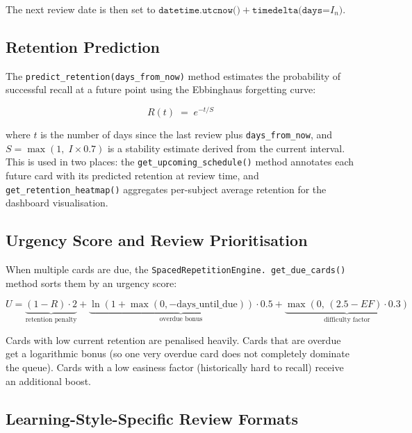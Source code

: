 \documentclass[12pt,a4paper]{article}
\begin{document}
The next review date is then set to
$\texttt{datetime.utcnow()} + \texttt{timedelta(days=}I_n\texttt{)}$.

\subsection{Retention Prediction}

The \texttt{predict\_retention(days\_from\_now)} method estimates
the probability of successful recall at a future point using the
Ebbinghaus forgetting curve:

\begin{equation}
  R(t) \;=\; e^{-t/S}
\end{equation}

where $t$ is the number of days since the last review plus
\texttt{days\_from\_now}, and $S = \max(1,\; I \times 0.7)$ is a
stability estimate derived from the current interval. This is used
in two places: the \texttt{get\_upcoming\_schedule()} method
annotates each future card with its predicted retention at review
time, and \texttt{get\_retention\_heatmap()} aggregates per-subject
average retention for the dashboard visualisation.

\subsection{Urgency Score and Review Prioritisation}

When multiple cards are due, the \texttt{SpacedRepetitionEngine.
get\_due\_cards()} method sorts them by an urgency score:

\begin{equation}
  U = \underbrace{(1-R)\cdot 2}_{\text{retention penalty}}
  + \underbrace{\ln(1 + \max(0, -\text{days\_until\_due}))\cdot 0.5}
              _{\text{overdue bonus}}
  + \underbrace{\max(0,\,(2.5-EF)\cdot 0.3)}_{\text{difficulty factor}}
\end{equation}

Cards with low current retention are penalised heavily. Cards that
are overdue get a logarithmic bonus (so one very overdue card does
not completely dominate the queue). Cards with a low easiness factor
(historically hard to recall) receive an additional boost.

\subsection{Learning-Style-Specific Review Formats}
\end{document}
